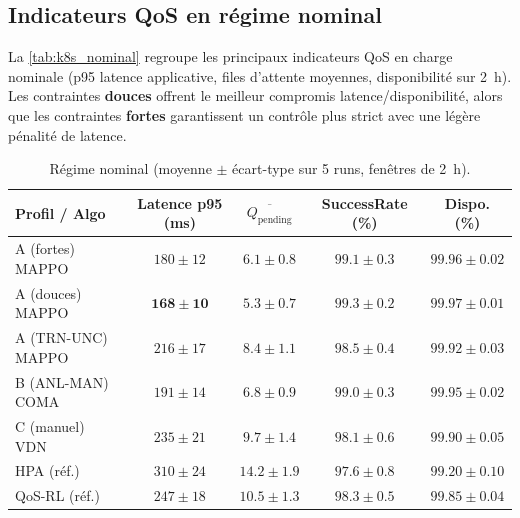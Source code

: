\subsection*{Indicateurs QoS en régime nominal}

La \autoref{tab:k8s_nominal} regroupe les principaux indicateurs QoS en charge nominale (p95 latence applicative, files d’attente moyennes, disponibilité sur 2~h).
Les contraintes \textbf{douces} offrent le meilleur compromis latence/disponibilité, alors que les contraintes \textbf{fortes} garantissent un contrôle plus strict avec une légère pénalité de latence.

\begin{table}[h!]
  \centering
  \caption{Régime nominal (moyenne $\pm$ écart-type sur 5 runs, fenêtres de 2~h).}
  \label{tab:k8s_nominal}
  \renewcommand{\arraystretch}{1.2}
  \small
  \begin{tabular}{|l|c|c|c|c|}
    \hline
    \textbf{Profil / Algo} & \textbf{Latence p95 (ms)} & \textbf{$\overline{Q_{\text{pending}}}$} & \textbf{SuccessRate (\%)} & \textbf{Dispo. (\%)}      \\
    \hline
    A (fortes) MAPPO       & $180 \pm 12$              & $6.1 \pm 0.8$                            & $99.1 \pm 0.3$            & $99.96 \pm 0.02$          \\
    A (douces) MAPPO       & $\mathbf{168 \pm 10}$     & $\mathbf{5.3 \pm 0.7}$                   & $\mathbf{99.3 \pm 0.2}$   & $\mathbf{99.97 \pm 0.01}$ \\
    A (TRN-UNC) MAPPO      & $216 \pm 17$              & $8.4 \pm 1.1$                            & $98.5 \pm 0.4$            & $99.92 \pm 0.03$          \\
    \hline
    B (ANL-MAN) COMA       & $191 \pm 14$              & $6.8 \pm 0.9$                            & $99.0 \pm 0.3$            & $99.95 \pm 0.02$          \\
    C (manuel) VDN         & $235 \pm 21$              & $9.7 \pm 1.4$                            & $98.1 \pm 0.6$            & $99.90 \pm 0.05$          \\
    \hline
    HPA (réf.)             & $310 \pm 24$              & $14.2 \pm 1.9$                           & $97.6 \pm 0.8$            & $99.20 \pm 0.10$          \\
    QoS-RL (réf.)          & $247 \pm 18$              & $10.5 \pm 1.3$                           & $98.3 \pm 0.5$            & $99.85 \pm 0.04$          \\
    \hline
  \end{tabular}
\end{table}

